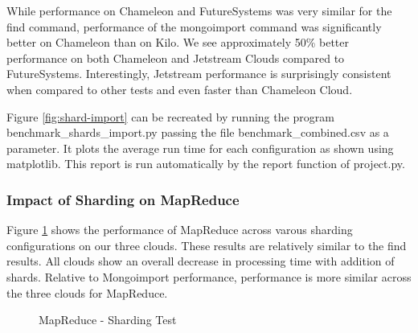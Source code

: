 \documentclass[9pt,twocolumn,twoside]{../../styles/osajnl}
\begin{document}
While performance on Chameleon and FutureSystems was very similar for the find command, performance of the mongoimport command was significantly better on Chameleon than on Kilo.  We see approximately 50\% better performance on both Chameleon and Jetstream Clouds compared to FutureSystems. Interestingly, Jetstream performance is surprisingly consistent when compared to other tests and even faster than Chameleon Cloud.

Figure \ref{fig:shard-import} can be recreated by running the program benchmark\_shards\_import.py passing the file benchmark\_combined.csv as a parameter.  It plots the average run time for each configuration as shown using matplotlib.    This report is run automatically by the report function of project.py.

\subsubsection{Impact of Sharding on MapReduce}



Figure \ref{fig:shard-mapreduce} shows the performance of MapReduce across varous sharding configurations on our three clouds.  These results are relatively similar to the find results.  All clouds show an overall decrease in processing time with addition of shards.  Relative to Mongoimport performance, performance is more similar across the three clouds for MapReduce.

\begin{figure}[htbp]
\centering
{}
\caption{MapReduce - Sharding Test}
\label{fig:shard-mapreduce}
\end{figure}
\end{document}
